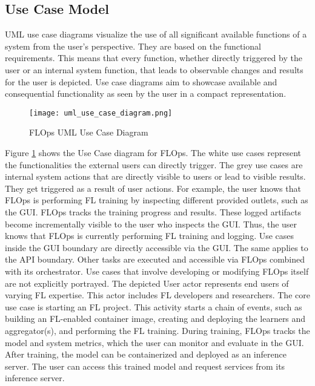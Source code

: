 \subsection{Use Case Model}

UML use case diagrams visualize the use of all significant available functions of a system from the user's perspective.
They are based on the functional requirements.
This means that every function, whether directly triggered by the user or an internal system function, that leads to observable changes and results for the user is depicted.
Use case diagrams aim to showcase available and consequential functionality as seen by the user in a compact representation. \cite{book:bruegge}

\begin{figure}[p]
    \begin{adjustwidth}{-0.1\paperwidth}{-0.1\paperwidth}
        \centering
        \texttt{[image: uml\_use\_case\_diagram.png]}
        \caption{FLOps UML Use Case Diagram}
        \label{fig:uml_use_case_diagram}
    \end{adjustwidth}
\end{figure}

Figure \ref{fig:uml_use_case_diagram} shows the Use Case diagram for FLOps.
The white use cases represent the functionalities the external users can directly trigger.
The grey use cases are internal system actions that are directly visible to users or lead to visible results.
They get triggered as a result of user actions.
For example, the user knows that FLOps is performing FL training by inspecting different provided outlets, such as the GUI.
FLOps tracks the training progress and results.
These logged artifacts become incrementally visible to the user who inspects the GUI.
Thus, the user knows that FLOps is currently performing FL training and logging.
Use cases inside the GUI boundary are directly accessible via the GUI. 
The same applies to the API boundary.
Other tasks are executed and accessible via FLOps combined with its orchestrator.
Use cases that involve developing or modifying FLOps itself are not explicitly portrayed.
The depicted User actor represents end users of varying FL expertise.
This actor includes FL developers and researchers.
The core use case is starting an FL project.
This activity starts a chain of events, such as building an FL-enabled container image, creating and deploying the learners and aggregator(s), and performing the FL training.
During training, FLOps tracks the model and system metrics, which the user can monitor and evaluate in the GUI.
After training, the model can be containerized and deployed as an inference server.
The user can access this trained model and request services from its inference server.
